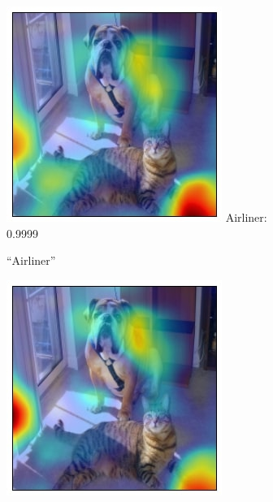 \begin{figure}[ht!]
\begin{center}
\begin{subfigure}[b]{0.33\linewidth}
        \includegraphics[width=1\linewidth]{figures/caffe2_figs/gcam_pos_vgg_airliner_405.jpg}
        \tiny{Airliner: 0.9999\\}
		\caption{\tiny{\gcam{} ``Airliner''}}
        \label{fig:gcam_airliner_airliner}
	\end{subfigure}
    \begin{subfigure}[b]{0.33\linewidth}
    \vspace{10pt} 
        \centering
        \includegraphics[width=1\linewidth]{figures/caffe2_figs/gcam_pos_vgg_airliner_813.jpg}

\end{subfigure}
\end{center}
\end{figure}
